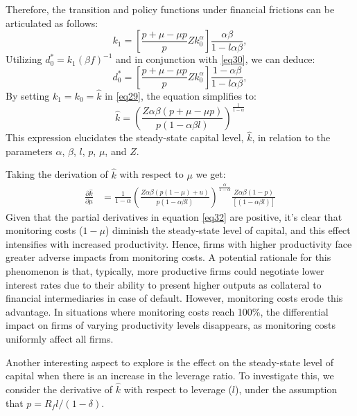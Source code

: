 \documentclass[12pt]{report}
\begin{document}
Therefore, the transition and policy functions under financial frictions can be articulated as follows:
\begin{equation}
    k_1 = \left[ \frac{p + \mu - \mu p}{p}Z k_0^{\alpha}\right] \frac{\alpha\beta}{1-l\alpha\beta}, \label{eq29}
\end{equation}
Utilizing \(d^*_0 = k_1(\beta f)^{-1}\) and in conjunction with \ref{eq30}, we can deduce:
\begin{equation}
    d^*_0 = \left[ \frac{p + \mu - \mu p}{p}Z k_0^{\alpha}\right] \frac{1-\alpha\beta}{1-l\alpha\beta} \label{eq31},
\end{equation}
By setting \(k_1 = k_0 = \hat{k}\) in \ref{eq29}, the equation simplifies to:
\begin{equation}
    \hat{k} = \left(\frac{Z \alpha \beta (p + \mu - \mu p)}{p(1 - \alpha \beta l)}\right)^{\frac{1}{1-\alpha}} \label{eq33}
\end{equation}
This expression elucidates the steady-state capital level, \(\hat{k}\), in relation to the parameters \(\alpha\), \(\beta\), \(l\), \(p\), \(\mu\), and \(Z\).

Taking the derivation of \(\hat{k}\) with respect to \(\mu\) we get:
\begin{align}
    \frac{\partial \hat{k}}{\partial \mu}&=\frac{1}{1-\alpha}\left(\frac{Z\alpha\beta(p(1-\mu) + u)}{p(1-\alpha \beta l)}\right)^{\frac{\alpha}{1-\alpha}} \frac{Z \alpha \beta(1-p)}{[(1-
    \alpha \beta l)]} \label{eq32}
\end{align}
Given that the partial derivatives in equation \ref{eq32} are positive, it's clear that monitoring costs (\(1-\mu\))
diminish the steady-state level of capital, and this effect intensifies with increased productivity. Hence, firms with
higher productivity face greater adverse impacts from monitoring costs. A potential rationale for this phenomenon is
that, typically, more productive firms could negotiate lower interest rates due to their ability to present higher
outputs as collateral to financial intermediaries in case of default. However, monitoring costs erode this advantage. In
situations where monitoring costs reach 100\%, the differential impact on firms of varying productivity levels
disappears, as monitoring costs uniformly affect all firms. 

Another interesting aspect to explore is the effect on the steady-state level of capital when there is an increase in
the leverage ratio. To investigate this, we consider the derivative of \(\hat{k}\) with respect to leverage (\(l\)),
under the assumption that \(p = R_f l / (1 - \delta)\). 
\end{document}
